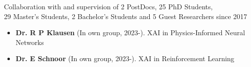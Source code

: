 
\newcommand{\supervision}[3]{\textbf{#1} (In own group, #2). {\small #3}}
\newcommand{\cosupervision}[4]{\textbf{#1} (#2, #3, co-supervision). {\small #4}}

\ifdefined\shortcv
    {
        \hspace*{\fill} Collaboration with and supervision of 2 PostDocs, 25 PhD Students,\\
        \hspace*{\fill} 29 Master's Students, 2 Bachelor's Students and 5 Guest Researchers since 2017
        }
\else
        {
            \begin{itemize}
                \item [] \supervision{Dr. R P Klausen}{2023-}{XAI in Physics-Informed Neural Networks}
                \item [] \supervision{Dr. E Schnoor}{2023-}{XAI in Reinforcement Learning}
            \end{itemize}
        }

